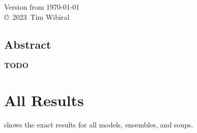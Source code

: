 \documentclass[a4paper,12pt,
headsepline,           %
oneside,               %
bibtotoc,              %
]{scrbook}
\newcommand{\fullname}{Tim Wibiral}
\newcommand{\jahr}{2023}
\begin{document}
\clearpage
\thispagestyle{empty}
{ \small
  \centering
  Version from \today \\\vfill
  \copyright~\jahr~\fullname\\[0.5em]
}
\clearpage



\thispagestyle{plain}
\section*{Abstract}

\textbf{TODO}
\clearpage

\mainmatter




\appendix
\chapter{All Results}\label{appendix:results}

 shows the exact results for all models, ensembles, and soups.

\end{document}
